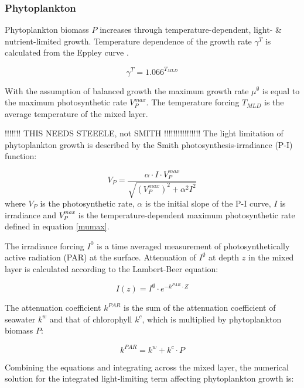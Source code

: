 \documentclass[template.tex]{subfiles}
\begin{document}
\subsubsection{Phytoplankton}
Phytoplankton biomass $P$ increases through temperature-dependent, light- \& nutrient-limited growth. Temperature dependence of the  growth rate $\gamma^{T}$ is calculated from the Eppley curve \citep{Eppley1972TemperatureSea}.

\begin{equation}
    \gamma^{T} = 1.066^{T_{MLD}} \label{mumax}
\end{equation}

With the assumption of balanced growth the maximum growth rate $\mu^{\emptyset}$ is equal to the maximum photosynthetic rate $V^{max}_P$. The temperature forcing $T_{MLD}$ is the average temperature of the mixed layer.

!!!!!!! THIS NEEDS STEEELE, not SMITH !!!!!!!!!!!!!!!!
The light limitation of phytoplankton growth is described by the Smith photosynthesis-irradiance (P-I) function:

\begin{equation}
    V_P = \frac{\alpha \cdot I \cdot V^{max}_P}{\sqrt{(V^{max}_P)^2 + \alpha^2 I^2}}
\end{equation}
where $V_P$ is the photosynthetic rate, $\alpha$ is the initial slope of the P-I curve, $I$ is irradiance and $V^{max}_P$ is the temperature-dependent maximum photosynthetic rate defined in equation \eqref{mumax}.


The irradiance forcing $I^0$ is a time averaged measurement of photosynthetically active radiation (PAR) at the surface. Attenuation of $I^\emptyset$ at depth $z$ in the mixed layer is calculated according to the Lambert-Beer equation:

\begin{equation}
    I(z) = I^\emptyset \cdot e^{-k^{PAR} \cdot Z} \label{beer}
\end{equation}

The attenuation coefficient $k^{PAR}$ is the sum of the attenuation coefficient of seawater $k^w$ and that of chlorophyll $k^c$, which is multiplied by phytoplankton biomass $P$:

\begin{equation}
    k^{PAR} = k^w + k^c \cdot P
\end{equation}

Combining the equations and integrating across the mixed layer, the numerical solution for the integrated light-limiting term affecting phytoplankton growth is:
\end{document}
